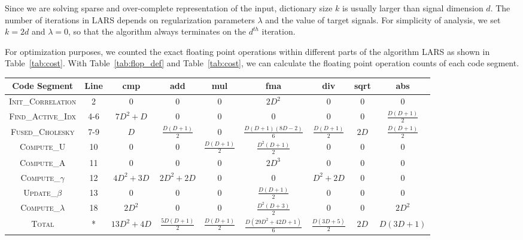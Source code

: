 Since we are solving sparse and over-complete representation of the input, dictionary size $k$ is usually larger than signal dimension $d$. The number of iterations in LARS depends on regularization parameters $\lambda$ and the value of target signals. For simplicity of analysis, we set $k = 2d$ and $\lambda = 0$, so that the algorithm always terminates on the $d^{th}$ iteration. 

For optimization purposes, we counted the exact floating point operations within different parts of the algorithm LARS as shown in Table~\ref{tab:cost}. With Table~\ref{tab:flop_def} and Table~\ref{tab:cost}, we can calculate the floating point operation counts of each code segment.


\begin{table*}[ht!]
\centering
\begin{tabular}{|c || c | c | c | c | c | c | c | c |}
\hline
 Code Segment & Line & cmp & add & mul & fma & div & sqrt & abs \\
\hline\hline
\textsc{Init\_Correlation} & 2 & 0 & 0 & 0 & $2D^2$ & 0 & 0 & 0 \\ 
\textsc{Find\_Active\_Idx} & 4-6 & $7D^2+D$ & 0 & 0 & 0 & 0 & 0 & $\frac{D(D+1)}{2}$ \\
\textsc{Fused\_Cholesky} & 7-9 & $D$ & $\frac{D(D+1)}{2}$ & 0 & $\frac{D(D+1)(8D-2)}{6}$ & $\frac{D(D+1)}{2}$ & $2D$ & $\frac{D(D+1)}{2}$ \\
\textsc{Compute\_U} & 10 & 0 & 0 & $\frac{D(D+1)}{2}$ & $\frac{D^2(D+1)}{2}$ & 0 & 0 & 0  \\
\textsc{Compute\_A} & 11 & 0 & 0 & 0 & $2D^3$ & 0 & 0 & 0  \\
\textsc{Compute\_$\gamma$} & 12 & $4D^2+3D$ & $2D^2+2D$ & 0 & 0 & $D^2+2D$ & 0 & 0  \\
\textsc{Update\_$\beta$} & 13 & 0 & 0 & 0 & $\frac{D(D+1)}{2}$ & 0 & 0 & 0  \\
\textsc{Compute\_$\lambda$} & 18 & $2D^2$ & 0 & 0 & $\frac{D^2(D+3)}{2}$ & 0 & 0 & $2D^2$  \\
\hline
\textsc{Total} & * & $13D^2+4D$ & $\frac{5D(D+1)}{2}$ & $\frac{D(D+1)}{2}$ & $\frac{D(29D^2+42D+1)}{6}$ & $\frac{D(3D+5)}{2}$ & $2D$ & $D(3D+1)$  \\
\hline
\end{tabular}
\caption{Cost analysis on each code segments of Algorithm~\ref{alg:lars}. $D$ is the dimension of the target signal.}
\label{tab:cost}
\end{table*}








